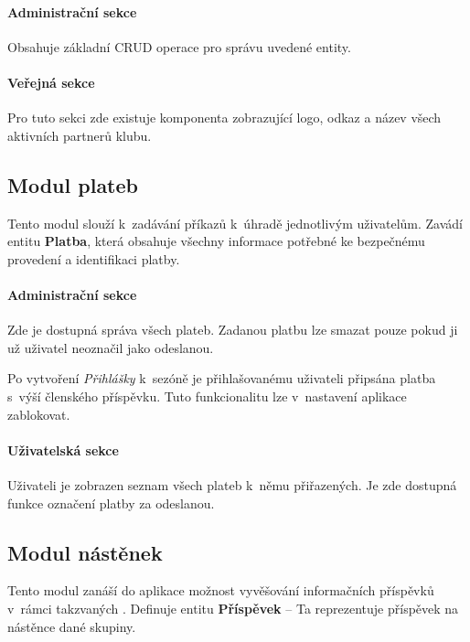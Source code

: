 \documentclass[11pt,oneside]{fithesis}
\begin{document}
            \paragraph*{Administrační sekce}

            Obsahuje základní CRUD operace pro správu uvedené entity.

           \paragraph*{Veřejná sekce}

            Pro tuto sekci zde existuje komponenta zobrazující logo, odkaz a název všech
            aktivních partnerů klubu.


            \subsection{Modul plateb}
            Tento modul slouží k zadávání příkazů k úhradě jednotlivým uživatelům. Zavádí entitu \textbf{Platba}, která obsahuje všechny informace potřebné ke bezpečnému provedení a identifikaci platby.

           \paragraph*{Administrační sekce}

           Zde je dostupná správa všech plateb. Zadanou platbu lze smazat pouze pokud ji už uživatel neoznačil jako odeslanou.
           
           Po vytvoření \textit{Přihlášky} k sezóně je přihlašovanému uživateli připsána platba s výší členského příspěvku. Tuto funkcionalitu lze v nastavení aplikace zablokovat.

           \paragraph*{Uživatelská sekce}

           Uživateli je zobrazen seznam všech plateb k němu přiřazených. Je zde dostupná funkce označení platby za odeslanou.            

                \subsection{Modul nástěnek}
            Tento modul zanáší do aplikace možnost vyvěšování informačních příspěvků v rámci takzvaných . Definuje entitu \textbf{Příspěvek} – Ta reprezentuje příspěvek na nástěnce dané skupiny.
\end{document}
